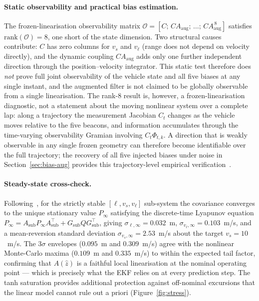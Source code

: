 \documentclass[11pt,a4paper]{article}
\begin{document}
\paragraph{Static observability and practical bias estimation.}
The frozen-linearisation observability matrix
$\mathcal{O}=[C;\,CA_\text{aug};\,\dots;\,CA_\text{aug}^{\,8}]$
satisfies $\mathrm{rank}(\mathcal{O})=8$, one short of the state
dimension. Two structural causes contribute: $C$ has zero columns for
$v_s$ and $v_\ell$ (range does not depend on velocity directly), and
the dynamic coupling $CA_\text{aug}$ adds only one further
independent direction through the position--velocity integrator. This
static test therefore does \emph{not} prove full joint observability
of the vehicle state and all five biases at any single instant, and
the augmented filter is not claimed to be globally observable from a
single linearisation. The rank-$8$ result is, however, a
frozen-linearisation diagnostic, not a statement about the moving
nonlinear system over a complete lap: along a trajectory the
measurement Jacobian $C_t$ changes as the vehicle moves relative to
the five beacons, and information accumulates through the
time-varying observability Gramian involving $C_t\Phi_{t,k}$. A
direction that is weakly observable in any single frozen geometry can
therefore become identifiable over the full trajectory; the
recovery of all five injected biases under noise in
Section~\ref{sec:bias-aug} provides this trajectory-level empirical
verification~\cite{Simon2006}.

\paragraph{Steady-state cross-check.}
Following~\cite{KalmanI}, for the strictly stable
$[\ell,v_s,v_\ell]$ sub-system the covariance converges to the
unique stationary value $P_\infty$ satisfying the discrete-time
Lyapunov equation $P_\infty=A_\text{sub}P_\infty A_\text{sub}^{\!
\top}+G_\text{sub}QG_\text{sub}^{\!\top}$, giving
$\sigma_{\ell,\infty}=0.032$~m, $\sigma_{v_\ell,\infty}=0.103$~m/s,
and a mean-reversion standard deviation $\sigma_{v_s,\infty}=
2.53$~m/s about the target $v_s=10$~m/s. The $3\sigma$ envelopes
($0.095$~m and $0.309$~m/s) agree with the nonlinear Monte-Carlo
maxima ($0.109$~m and $0.335$~m/s) to within the expected tail
factor, confirming that $A(\hat{z})$ is a faithful local
linearisation at the nominal operating point --- which is precisely
what the EKF relies on at every prediction step. The tanh saturation
provides additional protection against off-nominal excursions that
the linear model cannot rule out a priori
(Figure~\ref{fig:stress}).
\end{document}
